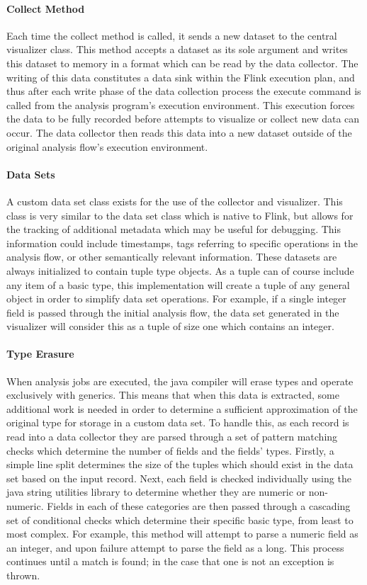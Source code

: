 \paragraph{Collect Method}
Each time the collect method is called, it sends a new dataset to the central visualizer class. This method accepts a dataset as its sole argument and writes this dataset to memory in a format which can be read by the data collector. The writing of this data constitutes a data sink within the Flink execution plan, and thus after each write phase of the data collection process the execute command is called from the analysis program's execution environment. This execution forces the data to be fully recorded before attempts to visualize or collect new data can occur. The data collector then reads this data into a new dataset outside of the original analysis flow's execution environment.
  
\paragraph{Data Sets}
A custom data set class exists for the use of the collector and visualizer. This class is very similar to the data set class which is native to Flink, but allows for the tracking of additional metadata which may be useful for debugging. This information could include timestamps, tags referring to specific operations in the analysis flow, or other semantically relevant information. These datasets are always initialized to contain tuple type objects. As a tuple can of course include any item of a basic type, this implementation will create a tuple of any general object in order to simplify data set operations. For example, if a single integer field is passed through the initial analysis flow, the data set generated in the visualizer will consider this as a tuple of size one which contains an integer.

\paragraph{Type Erasure}
When analysis jobs are executed, the java compiler will erase types and operate exclusively with generics. This means that when this data is extracted, some additional work is needed in order to determine a sufficient approximation of the original type for storage in a custom data set. To handle this, as each record is read into a data collector they are parsed through a set of pattern matching checks which determine the number of fields and the fields' types. Firstly, a simple line split determines the size of the tuples which should exist in the data set based on the input record. Next, each field is checked individually using the java string utilities library to determine whether they are numeric or non-numeric. Fields in each of these categories are then passed through a cascading set of conditional checks which determine their specific basic type, from least to most complex. For example, this method will attempt to parse a numeric field as an integer, and upon failure attempt to parse the field as a long. This process continues until a match is found; in the case that one is not an exception is thrown. 

